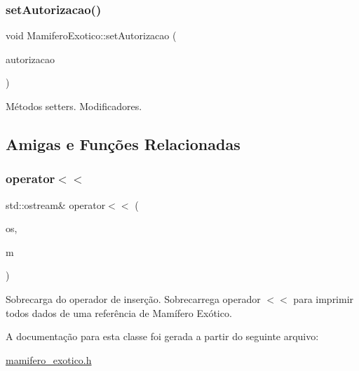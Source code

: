 \subsubsection{\texorpdfstring{set\+Autorizacao()}{setAutorizacao()}}
{\footnotesize\ttfamily void Mamifero\+Exotico\+::set\+Autorizacao (\begin{DoxyParamCaption}\item[{std\+::string}]{autorizacao }\end{DoxyParamCaption})}

Métodos setters. Modificadores. 

\subsection{Amigas e Funções Relacionadas}
\mbox{\label{classMamiferoExotico_a231b2c30dd191f7b75c98f75e40f1ddb}} 
\subsubsection{\texorpdfstring{operator$<$$<$}{operator<<}}
{\footnotesize\ttfamily std\+::ostream\& operator$<$$<$ (\begin{DoxyParamCaption}\item[{std\+::ostream \&}]{os,  }\item[{\hyperlink{classMamiferoExotico}{Mamifero\+Exotico} \&}]{m }\end{DoxyParamCaption})\hspace{0.3cm}{\ttfamily [friend]}}

Sobrecarga do operador de inserção. Sobrecarrega operador $<$$<$ para imprimir todos dados de uma referência de Mamífero Exótico. 

A documentação para esta classe foi gerada a partir do seguinte arquivo\+:\begin{DoxyCompactItemize}
\item 
\hyperlink{mamifero__exotico_8h}{mamifero\+\_\+exotico.\+h}\end{DoxyCompactItemize}
